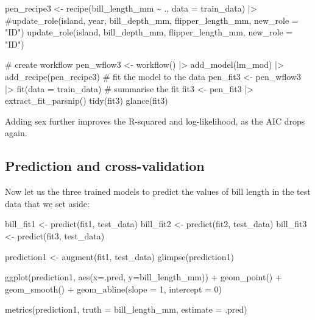 \documentclass[
  letterpaper,
  DIV=11,
  numbers=noendperiod]{scrreprt}
\newenvironment{Shaded}{\begin{snugshade}}{\end{snugshade}}
\newcommand{\NormalTok}[1]{\textcolor[rgb]{0.00,0.23,0.31}{#1}}
\begin{document}
\begin{Shaded}
\begin{Highlighting}[]
\NormalTok{pen\_recipe3 \textless{}{-} }
\NormalTok{  recipe(bill\_length\_mm \textasciitilde{} ., data = train\_data) |\textgreater{} }
\NormalTok{  \#update\_role(island, year, bill\_depth\_mm, flipper\_length\_mm, new\_role = "ID")}
\NormalTok{  update\_role(island,  bill\_depth\_mm, flipper\_length\_mm, new\_role = "ID") }

\NormalTok{\# create workflow}
\NormalTok{pen\_wflow3 \textless{}{-} }
\NormalTok{  workflow() |\textgreater{} }
\NormalTok{  add\_model(lm\_mod) |\textgreater{} }
\NormalTok{  add\_recipe(pen\_recipe3)}
\NormalTok{\# fit the model to the data}
\NormalTok{pen\_fit3 \textless{}{-} }
\NormalTok{  pen\_wflow3 |\textgreater{} }
\NormalTok{  fit(data = train\_data)}
\NormalTok{\# summarise the fit}
\NormalTok{fit3 \textless{}{-} pen\_fit3 |\textgreater{} }
\NormalTok{  extract\_fit\_parsnip() }
\NormalTok{tidy(fit3)}
\NormalTok{glance(fit3) }
\end{Highlighting}
\end{Shaded}

Adding sex further improves the R-squared and log-likelihood, as the AIC
drops again.

\subsection{Prediction and
cross-validation}\label{prediction-and-cross-validation}

Now let us the three trained models to predict the values of bill length
in the test data that we set aside:

\begin{Shaded}
\begin{Highlighting}[]
\NormalTok{bill\_fit1 \textless{}{-} predict(fit1, test\_data)}
\NormalTok{bill\_fit2 \textless{}{-} predict(fit2, test\_data)}
\NormalTok{bill\_fit3 \textless{}{-} predict(fit3, test\_data)}

\NormalTok{prediction1 \textless{}{-} augment(fit1, test\_data)}
\NormalTok{glimpse(prediction1)}

\NormalTok{ggplot(prediction1, aes(x=.pred, y=bill\_length\_mm)) + geom\_point() + geom\_smooth() + geom\_abline(slope = 1, intercept = 0)}

\NormalTok{metrics(prediction1, truth = bill\_length\_mm, estimate = .pred)}
\end{Highlighting}
\end{Shaded}
\end{document}
